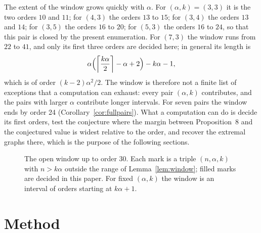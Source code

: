 \documentclass[11pt]{article}
\theoremstyle{definition}
\theoremstyle{remark}
\newcommand{\ceil}[1]{\left\lceil #1\right\rceil}
\begin{document}
The extent of the window grows quickly with $\alpha$. For $(\alpha,k)=(3,3)$ it is the two orders $10$ and $11$; for
$(4,3)$ the orders $13$ to $15$; for $(3,4)$ the orders $13$ and $14$; for $(3,5)$ the orders $16$ to $20$; for $(5,3)$
the orders $16$ to $24$, so that this pair is closed by the present enumeration. For $(7,3)$ the window runs from $22$
to $41$, and only its first three orders are decided here; in general its length is
\begin{equation}\label{eq:windowlength}
\alpha\Bigl(\ceil{\frac{k\alpha}{2}}-\alpha+2\Bigr)-k\alpha-1,
\end{equation}
which is of order $(k-2)\alpha^2/2$. The window is therefore not a finite list of exceptions that a computation can exhaust:
every pair $(\alpha,k)$ contributes, and the pairs with larger $\alpha$ contribute longer intervals. For seven pairs the window ends by order 24
(Corollary~\ref{cor:fullpairs}). What a computation
can do is decide its first orders, test the conjecture where the margin between Proposition~8 and the conjectured
value is widest relative to the order, and recover the extremal graphs there, which is the purpose of the following
sections.

\begin{table}[t]
\centering\small
\caption{The open window by order $n$: the number of open-window triples, the number decided in this paper, and the
pairs $(\alpha,k)$. Every triple with $n\le24$ is decided except where the last column of Table~\ref{tab:values} gives
a bound.}
\label{tab:window}

\end{table}

\begin{figure}[t]
\centering

\caption{The open window up to order 30. Each mark is a triple $(n,\alpha,k)$ with $n>k\alpha$ outside the range of
Lemma~\ref{lem:window}; filled marks are decided in this paper. For fixed $(\alpha,k)$ the window is an interval of
orders starting at $k\alpha+1$.}
\label{fig:window}
\end{figure}

\section{Method}\label{sec:method}
\end{document}
